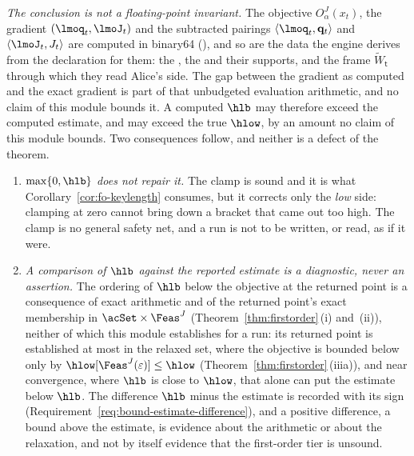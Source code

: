 \begin{remark}
\emph{The conclusion is not a floating-point invariant.} The objective
$O^{J}_{\alpha}(x_t)$, the gradient $(\lmoq_t,\lmoJ_t)$ and the subtracted
pairings $\langle\lmoq_t,\mathbf q_t\rangle$ and $\langle\lmoJ_t,J_t\rangle$
are computed in binary64 (), and so are
the data the engine derives from the declaration for them: the
, the  and their supports, and the frame
$\widetilde W_{\mathsf t}$
through which they read Alice's side. The gap between the gradient as
computed and the exact gradient is part of that unbudgeted evaluation
arithmetic, and no claim of this module bounds it. A computed $\hlb$ may
therefore exceed the computed estimate, and may exceed the true $\hlow$, by
an amount no claim of this module bounds. Two consequences follow, and
neither is a defect of the theorem.
\begin{enumerate}[label=(\alph*),leftmargin=2.2em]
\item \emph{$\max\{0,\hlb\}$ does not repair it.} The clamp is sound and
  it is what Corollary~\ref{cor:fo-keylength} consumes, but it corrects
  only the \emph{low} side: clamping at zero cannot bring down a bracket
  that came out too high. The clamp is no general safety net, and a run is
  not to be written, or read, as if it were.
\item \emph{A comparison of $\hlb$ against the reported estimate is a
  diagnostic, never an assertion.} The ordering of $\hlb$ below the
  objective at the returned point is a consequence of exact arithmetic and
  of the returned point's exact membership in $\acSet\times\Feas^{J}$
  (Theorem~\ref{thm:firstorder}\,(i) and~(ii)), neither of which this module
  establishes for a run: its returned point is established at most in the
  relaxed set, where the objective is bounded below only by
  $\hlow[\Feas^{J}(\varepsilon)]\le\hlow$
  (Theorem~\ref{thm:firstorder}\,(iiia)), and near convergence, where
  $\hlb$ is close to $\hlow$, that alone can put the estimate below $\hlb$.
  The difference $\hlb$ minus the estimate is recorded with its sign
  (Requirement~\ref{req:bound-estimate-difference}), and a positive
  difference, a bound above the estimate, is evidence about the arithmetic
  or about the relaxation, and not by itself evidence that the first-order
  tier is unsound.
\end{enumerate}


\end{remark}
